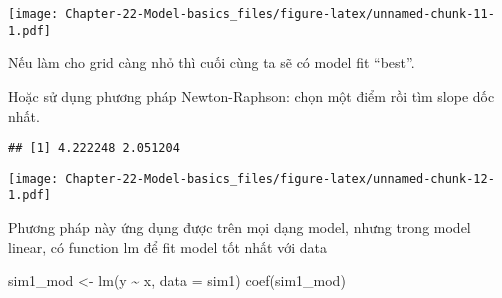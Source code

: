 \documentclass[
]{article}
\newenvironment{Shaded}{\begin{snugshade}}{\end{snugshade}}
\newcommand{\AttributeTok}[1]{\textcolor[rgb]{0.77,0.63,0.00}{#1}}
\newcommand{\DecValTok}[1]{\textcolor[rgb]{0.00,0.00,0.81}{#1}}
\newcommand{\FunctionTok}[1]{\textcolor[rgb]{0.00,0.00,0.00}{#1}}
\newcommand{\NormalTok}[1]{#1}
\newcommand{\OtherTok}[1]{\textcolor[rgb]{0.56,0.35,0.01}{#1}}
\newcommand{\SpecialCharTok}[1]{\textcolor[rgb]{0.00,0.00,0.00}{#1}}
\newcommand{\StringTok}[1]{\textcolor[rgb]{0.31,0.60,0.02}{#1}}
\begin{document}
\texttt{[image: Chapter-22-Model-basics\_files/figure-latex/unnamed-chunk-11-1.pdf]}

Nếu làm cho grid càng nhỏ thì cuối cùng ta sẽ có model fit ``best''.

Hoặc sử dụng phương pháp Newton-Raphson: chọn một điểm rồi tìm slope dốc
nhất.

\begin{Shaded}
\end{Shaded}

\begin{verbatim}
## [1] 4.222248 2.051204
\end{verbatim}

\begin{Shaded}
\end{Shaded}

\texttt{[image: Chapter-22-Model-basics\_files/figure-latex/unnamed-chunk-12-1.pdf]}

Phương pháp này ứng dụng được trên mọi dạng model, nhưng trong model
linear, có function lm để fit model tốt nhất với data

\begin{Shaded}
\begin{Highlighting}[]
\NormalTok{sim1\_mod }\OtherTok{\textless{}{-}} \FunctionTok{lm}\NormalTok{(y }\SpecialCharTok{\textasciitilde{}}\NormalTok{ x, }\AttributeTok{data =}\NormalTok{ sim1)}
\FunctionTok{coef}\NormalTok{(sim1\_mod)}
\end{Highlighting}
\end{Shaded}
\end{document}
